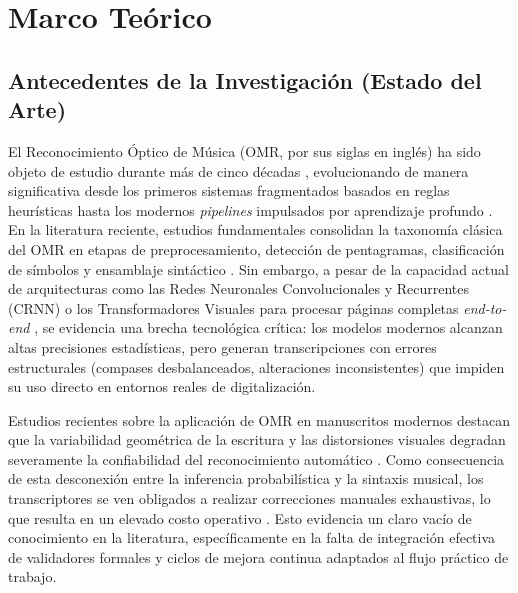 \section{Marco Te\'orico}
\label{sec:marco-teorico}

\subsection{Antecedentes de la Investigaci\'on (Estado del Arte)}
\label{sec:antecedentes-estado-arte}

El Reconocimiento \'Optico de M\'usica (OMR, por sus siglas en ingl\'es) ha sido objeto de estudio durante m\'as de cinco d\'ecadas \cite{omr2020}, evolucionando de manera significativa desde los primeros sistemas fragmentados basados en reglas heur\'isticas hasta los modernos \emph{pipelines} impulsados por aprendizaje profundo \cite{rebelo2012}. En la literatura reciente, estudios fundamentales consolidan la taxonom\'ia cl\'asica del OMR en etapas de preprocesamiento, detecci\'on de pentagramas, clasificaci\'on de s\'imbolos y ensamblaje sint\'actico \cite{omr2020}. Sin embargo, a pesar de la capacidad actual de arquitecturas como las Redes Neuronales Convolucionales y Recurrentes (CRNN) o los Transformadores Visuales para procesar p\'aginas completas \emph{end-to-end} \cite{calvo2018}\cite{riosvila2026}, se evidencia una brecha tecnol\'ogica cr\'itica: los modelos modernos alcanzan altas precisiones estad\'isticas, pero generan transcripciones con errores estructurales (compases desbalanceados, alteraciones inconsistentes) que impiden su uso directo en entornos reales de digitalizaci\'on.

Estudios recientes sobre la aplicaci\'on de OMR en manuscritos modernos destacan que la variabilidad geom\'etrica de la escritura y las distorsiones visuales degradan severamente la confiabilidad del reconocimiento autom\'atico \cite{ricordi2024}. Como consecuencia de esta desconexi\'on entre la inferencia probabil\'istica y la sintaxis musical, los transcriptores se ven obligados a realizar correcciones manuales exhaustivas, lo que resulta en un elevado costo operativo \cite{rizo2023}. Esto evidencia un claro vac\'io de conocimiento en la literatura, espec\'ificamente en la falta de integraci\'on efectiva de validadores formales y ciclos de mejora continua adaptados al flujo pr\'actico de trabajo.

